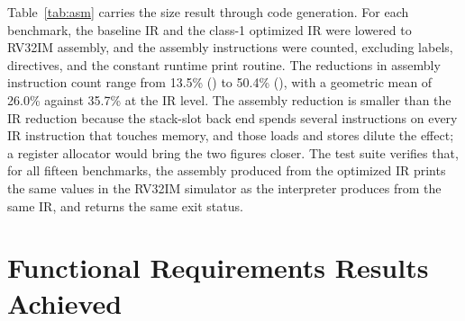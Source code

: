 Table~\ref{tab:asm} carries the size result through code generation. For each benchmark, the baseline IR and the class-1 optimized IR were lowered to RV32IM assembly, and the assembly instructions were counted, excluding labels, directives, and the constant runtime print routine. The reductions in assembly instruction count range from 13.5\% () to 50.4\% (), with a geometric mean of 26.0\% against 35.7\% at the IR level. The assembly reduction is smaller than the IR reduction because the stack-slot back end spends several instructions on every IR instruction that touches memory, and those loads and stores dilute the effect; a register allocator would bring the two figures closer. The test suite verifies that, for all fifteen benchmarks, the assembly produced from the optimized IR prints the same values in the RV32IM simulator as the interpreter produces from the same IR, and returns the same exit status.


\section{Functional Requirements Results Achieved}
\label{sec:fr}

